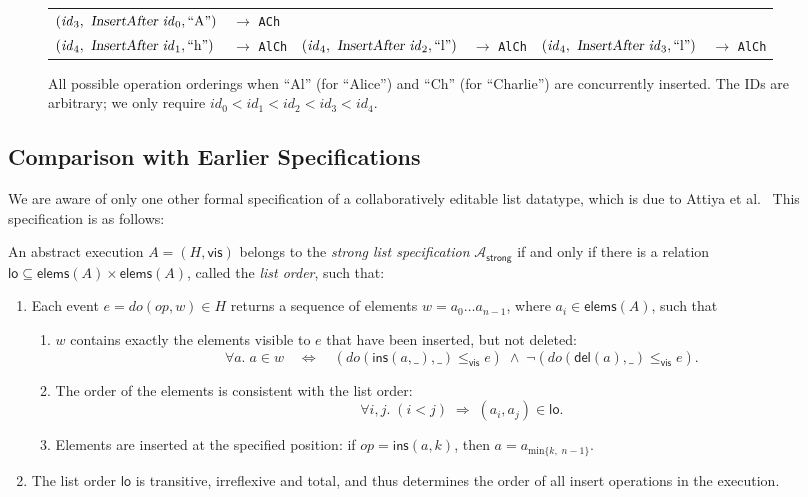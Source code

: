 \begin{figure}
\begin{tabular}{ll|ll|ll}
$(\mathit{id}_3, \isa{InsertAfter } \mathit{id}_0, \text{``A''})$ & $\rightarrow$ \texttt{ACh} \\
$(\mathit{id}_4, \isa{InsertAfter } \mathit{id}_1, \text{``h''})$ & $\rightarrow$ \texttt{AlCh} &
$(\mathit{id}_4, \isa{InsertAfter } \mathit{id}_2, \text{``l''})$ & $\rightarrow$ \texttt{AlCh} &
$(\mathit{id}_4, \isa{InsertAfter } \mathit{id}_3, \text{``l''})$ & $\rightarrow$ \texttt{AlCh} \\
\end{tabular}
\caption{All possible operation orderings when ``Al'' (for ``Alice'') and ``Ch'' (for ``Charlie'') are concurrently inserted.
The IDs are arbitrary; we only require $id_0 < id_1 < id_2 < id_3 < id_4$.}\label{fig:op-permutations}
\end{figure}

\subsection{Comparison with Earlier Specifications}

We are aware of only one other formal specification of a collaboratively editable list datatype, which is due to Attiya et al.~\cite{Attiya:2016kh}
This specification is as follows:
\begin{displayquote}
An abstract execution $A = (H, \textsf{vis})$ belongs to the \emph{strong list specification} $\mathcal{A}_\textsf{strong}$ if and only if there is a relation $\textsf{lo} \subseteq \textsf{elems}(A) \times \textsf{elems}(A)$, called the \emph{list order}, such that:
\begin{enumerate}
\item Each event $e = \mathit{do}(\mathit{op}, w) \in H$ returns a sequence of elements $w=a_0 \dots a_{n-1}$, where $a_i \in \textsf{elems}(A)$, such that
\begin{enumerate}
\item $w$ contains exactly the elements visible to $e$ that have been inserted, but not deleted:
\[ \forall a.\; a \in w \quad\Longleftrightarrow\quad (\mathit{do}(\textsf{ins}(a, \_), \_) \le_\textsf{vis} e)
\;\wedge\; \neg(\mathit{do}(\textsf{del}(a), \_) \le_\textsf{vis} e). \]
\item The order of the elements is consistent with the list order:
\[ \forall i, j.\; (i < j) \;\Longrightarrow\; (a_i, a_j) \in \textsf{lo}. \]
\item Elements are inserted at the specified position:
if $\mathit{op} = \textsf{ins}(a, k)$, then $a = a_{\mathrm{min} \{k,\; n-1\}}$.
\end{enumerate}
\item The list order $\textsf{lo}$ is transitive, irreflexive and total, and thus determines the order of all insert operations in the execution.
\end{enumerate}
\end{displayquote}


